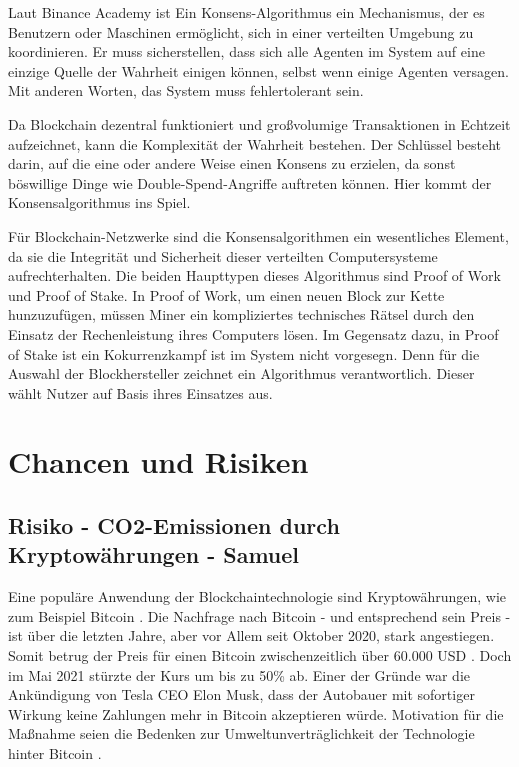 Laut Binance Academy ist Ein Konsens-Algorithmus ein Mechanismus, der es Benutzern oder Maschinen ermöglicht, sich in einer verteilten Umgebung zu koordinieren. Er muss sicherstellen, dass sich alle Agenten im System auf eine einzige Quelle der Wahrheit einigen können, selbst wenn einige Agenten versagen. Mit anderen Worten, das System muss fehlertolerant sein\cite{Binance21}.

Da Blockchain dezentral funktioniert und großvolumige Transaktionen in Echtzeit aufzeichnet, kann die Komplexität der Wahrheit bestehen. Der Schlüssel besteht darin, auf die eine oder andere Weise einen Konsens zu erzielen, da sonst böswillige Dinge wie Double-Spend-Angriffe auftreten können. Hier kommt der Konsensalgorithmus ins Spiel.

Für Blockchain-Netzwerke sind die Konsensalgorithmen ein wesentliches Element, da sie die Integrität und Sicherheit dieser verteilten Computersysteme aufrechterhalten. Die beiden Haupttypen dieses Algorithmus sind Proof of Work und Proof of Stake. In Proof of Work, um einen neuen Block zur Kette hunzuzufügen, müssen Miner ein kompliziertes technisches Rätsel durch den Einsatz der Rechenleistung ihres Computers lösen. Im Gegensatz dazu, in Proof of Stake ist ein Kokurrenzkampf ist im System nicht vorgesegn. Denn für die Auswahl der Blockhersteller zeichnet ein Algorithmus verantwortlich. Dieser wählt Nutzer auf Basis ihres Einsatzes aus.

\chapter{Chancen und Risiken}
\section{Risiko - CO2-Emissionen durch Kryptowährungen - Samuel}
Eine populäre Anwendung der Blockchaintechnologie sind Kryptowährungen, wie zum Beispiel Bitcoin \cite{schinckus_good_2020}. Die Nachfrage nach Bitcoin - und entsprechend sein Preis - ist über die letzten Jahre, aber vor Allem seit Oktober 2020, stark angestiegen. Somit betrug der Preis für einen Bitcoin zwischenzeitlich über 60.000 USD \cite{noauthor_coindesk_2021}. Doch im Mai 2021 stürzte der Kurs um bis zu 50\% ab. Einer der Gründe war die Ankündigung von Tesla CEO Elon Musk, dass der Autobauer mit sofortiger Wirkung keine Zahlungen mehr in Bitcoin akzeptieren würde. Motivation für die Maßnahme seien die Bedenken zur Umweltunverträglichkeit der Technologie hinter Bitcoin \cite{waters_musk_2021}. 

